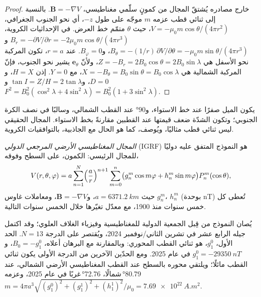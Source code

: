 \begin{proof}
خارج مصادره يُشتقّ المجال من كمونٍ سلّمي مغناطيسي،
$\mathbf B = -\nabla V$. بالنسبة إلى ثنائي قطب عزمه $m$ موجّه على طول $-z$،
أي نحو الجنوب الجغرافي، $V = -\mu_0 m\cos\theta/(4\pi r^2)$، حيث $\theta$
متمّم خط العرض. في الإحداثيات الكروية، $B_r = -\partial V/\partial r =
-2\mu_0 m\cos\theta/(4\pi r^3)$ و$B_\theta = -(1/r)\,\partial V/\partial\theta =
-\mu_0 m\sin\theta/(4\pi r^3)$، و$B_\varphi = 0$. عند $r = a$، تكون المركبة نحو الأسفل
هي $Z = -B_r = 2B_0\cos\theta = 2B_0\sin\lambda$، ولأنّ
$\mathbf e_\theta$ يشير نحو الجنوب، فإنّ المركبة الشمالية هي $X = -B_\theta =
B_0\sin\theta = B_0\cos\lambda$، مع $Y = 0$. إذن $H = X$، و$D = 0$، و$\tan I =
Z/H = 2\tan\lambda$ و$F^2 = B_0^2(\cos^2\lambda + 4\sin^2\lambda) =
B_0^2(1 + 3\sin^2\lambda)$.
\end{proof}

يكون الميل صفرًا عند خط الاستواء، و\ang{90} عند القطب الشمالي،
وسالبًا في نصف الكرة الجنوبي؛ وتكون الشدّة ضعف قيمتها عند القطبين مقارنةً
بخط الاستواء. المجال الحقيقي ليس ثنائي قطب مثاليًا، ويُوصف،
كما هو الحال مع الجاذبية، بالتوافقيات الكروية.

\begin{definition}\label{def:b3:palaeomagnetism:igrf}
\emph{المجال المغناطيسي الأرضي المرجعي الدولي}
(IGRF) هو النموذج المتفق عليه دوليًا للمجال
الرئيسي: الكمون، على السطح وفوقه،
\[
  V(r,\theta,\varphi) = a\sum_{n=1}^{N}\Bigl(\frac ar\Bigr)^{n+1}\sum_{m=0}^{n}
  \bigl(g_n^m\cos m\varphi + h_n^m\sin m\varphi\bigr)P_n^m(\cos\theta),
\]
حيث $a = \qty{6371.2}{km}$، و$\mathbf B = -\nabla V$، ومعاملات غاوس
$g_n^m$، $h_n^m$ (بوحدة \unit{nT}) تُعطى كل خمس سنوات منذ 1900،
مع معدّل تغيّرها خلال الخمس سنوات التالية.
\end{definition}

يُصان النموذج من قِبل الجمعية الدولية للمغناطيسية وفيزياء
الغلاف العلوي؛ وقد اكتمل جيله الرابع عشر في تشرين الثاني/نوفمبر 2024، ويُقتصر على
الدرجة $N = 13$. الحد الأول، $g_1^0$، هو ثنائي القطب المحوري:
وبالمقارنة مع البرهان أعلاه، $B_0 = -g_1^0$، و$g_1^0 = \qty{-29350}{nT}$
في عام 2025. ومع الحدّين الآخرين من الدرجة الأولى يكون ثنائي القطب مائلًا؛ ويلتقي محوره
بالسطح عند القطب المغناطيسي الأرضي الشمالي، عند \ang{80.79}\,شمالًا، \ang{72.76}\,غربًا في
عام 2025، وعزمه $m = 4\pi a^3\sqrt{(g_1^0)^2 + (g_1^1)^2 +
(h_1^1)^2}/\mu_0 = \qty{7.69e22}{A.m^2}$.

